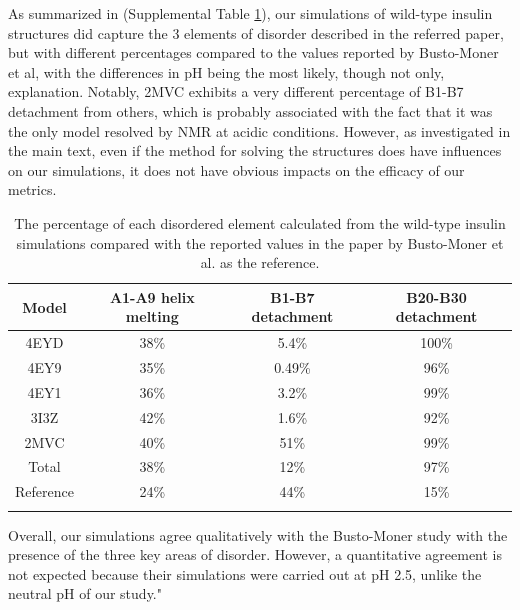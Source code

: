 \documentclass[sn-vancouver]{sn-jnl}
\begin{document}
As summarized in (Supplemental Table \ref{disorder}), our simulations of wild-type insulin structures did capture the 3 elements of disorder described in the referred paper, but with different percentages compared to the values reported by Busto-Moner et al, with the differences in pH being the most likely, though not only, explanation. Notably, 2MVC exhibits a very different percentage of B1-B7 detachment from others, which is probably associated with the fact that it was the only model resolved by NMR at acidic conditions. However, as investigated in the main text, even if the method for solving the structures does have influences on our simulations, it does not have obvious impacts on the efficacy of our metrics. 

\renewcommand{\thetable}{S\arabic{table}}
\begin{table}[ht]
\begin{minipage}{\textwidth}
\caption{The percentage of each disordered element calculated from the wild-type insulin simulations compared with the reported values in the paper by Busto-Moner et al. as the reference.}\label{disorder}
\centering
\begin{tabular}{@{}cccc@{}}
\toprule
Model & A1-A9 helix melting & B1-B7 detachment & B20-B30 detachment \\ 
\midrule
4EYD  & 38\%             & 5.4\%           & 100\%            \\ 
4EY9  & 35\%             & 0.49\%           & 96\%            \\ 
4EY1  & 36\%             & 3.2\%           & 99\%            \\ 
3I3Z  & 42\%             & 1.6\%           & 92\%            \\ 
2MVC  & 40\%             & 51\%          & 99\%             \\ 
\midrule
Total & 38\%             & 12\%          & 97\%            \\ 
Reference   & 24\%                & 44\%             & 15\% \\
\botrule
\end{tabular}
\end{minipage}
\end{table}

Overall, our simulations agree qualitatively with the Busto-Moner study with the presence of the three key areas of disorder. However, a quantitative agreement is not expected because their simulations were carried out at pH 2.5, unlike the neutral pH of our study."
\end{document}
